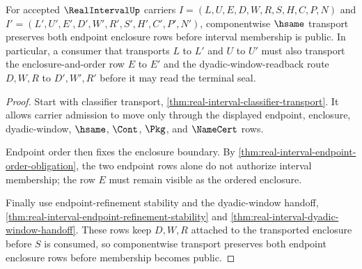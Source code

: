 \begin{theorem}
\label{thm:realinterval-endpoint-enclosure-transport}
For accepted $\RealIntervalUp$ carriers $I=(L,U,E,D,W,R,S,H,C,P,N)$ and $I'=(L',U',E',D',W',R',S',H',C',P',N')$, componentwise $\hsame$ transport preserves both endpoint enclosure rows before interval membership is public. In particular, a consumer that transports $L$ to $L'$ and $U$ to $U'$ must also transport the enclosure-and-order row $E$ to $E'$ and the dyadic-window-readback route $D,W,R$ to $D',W',R'$ before it may read the terminal seal.
\end{theorem}
\begin{proof}
Start with classifier transport, \autoref{thm:real-interval-classifier-transport}. It allows carrier admission to move only through the displayed endpoint, enclosure, dyadic-window, $\hsame$, $\Cont$, $\Pkg$, and $\NameCert$ rows.

Endpoint order then fixes the enclosure boundary. By \autoref{thm:real-interval-endpoint-order-obligation}, the two endpoint rows alone do not authorize interval membership; the row $E$ must remain visible as the ordered enclosure.

Finally use endpoint-refinement stability and the dyadic-window handoff, \autoref{thm:real-interval-endpoint-refinement-stability} and \autoref{thm:real-interval-dyadic-window-handoff}. These rows keep $D,W,R$ attached to the transported enclosure before $S$ is consumed, so componentwise transport preserves both endpoint enclosure rows before membership becomes public.
\end{proof}

